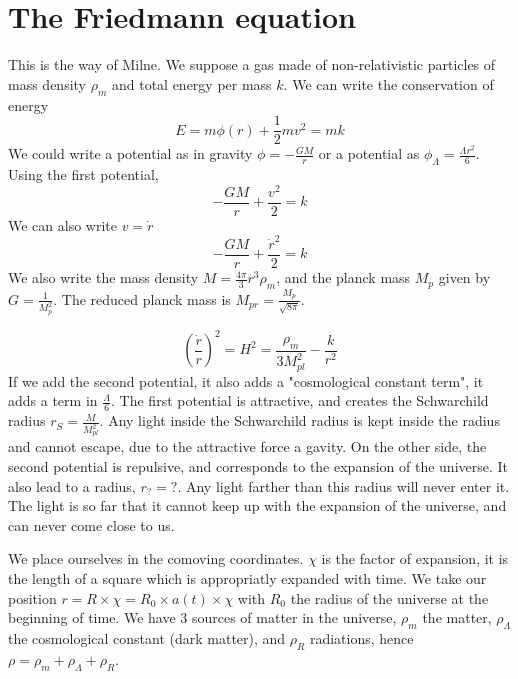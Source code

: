 \documentclass[a4paper]{book}
\theoremstyle{definition}
\theoremstyle{remark}
\begin{document}
\section{The Friedmann equation}
This is the way of Milne. We suppose a gas made of non-relativistic particles of mass density $\rho_m$ and total energy per mass $k$. We can write the conservation of energy 
\begin{equation}
    E = m\phi(r) + \frac{1}{2}mv^2 = mk
\end{equation}
We could write a potential as in gravity $\phi = -\frac{GM}{r}$ or a potential as $\phi_{\Lambda} = \frac{\Lambda r^2}{6}$. Using the first potential, 
\begin{equation}
-\frac{GM}{r} + \frac{v^2}{2} = k   
\end{equation}
We can also write $v=\dot r$
\begin{equation}
    -\frac{GM}{r} + \frac{\dot{r}^2}{2} = k   
\end{equation}
We also write the mass density $M = \frac{4\pi}{3}r^3 \rho_m$, and the planck mass $M_p$ given by $G = \frac{1}{M_p^2}$. The reduced planck mass is $M_{pr} = \frac{M_p}{\sqrt{8\pi}}$. 

\begin{equation}
    \left(\frac{\dot r}{r}\right)^2 = H^2 = \frac{\rho_m}{3M_{pl}^2} - \frac{k}{r^2}
\label{eq:firsteq}\end{equation}
If we add the second potential, it also adds a "cosmological constant term", it adds a term in $\frac{\Lambda}{6}$. The first potential is attractive, and creates the Schwarchild radius $r_S = \frac{M}{M^2_{pl}}$. Any light inside the Schwarchild radius is kept inside the radius and cannot escape, due to the attractive force a gavity. On the other side, the second potential is repulsive, and corresponds to the expansion of the universe. It also lead to a radius, $r_? = ?$. Any light farther than this radius will never enter it. The light is so far that it cannot keep up with the expansion of the universe, and can never come close to us. \par \medskip 

We place ourselves in the comoving coordinates. $\chi$ is the factor of expansion, it is the length of a square which is appropriatly expanded with time. We take our position $r = R\times \chi = R_0 \times a(t) \times \chi$ with $R_0$ the radius of the universe at the beginning of time. We have 3 sources of matter in the universe, $\rho_m$ the matter, $\rho_\Lambda$ the cosmological constant (dark matter), and $\rho_R$ radiations, hence $\rho = \rho_m + \rho_\Lambda + \rho_R$. \par \medskip 
\end{document}
